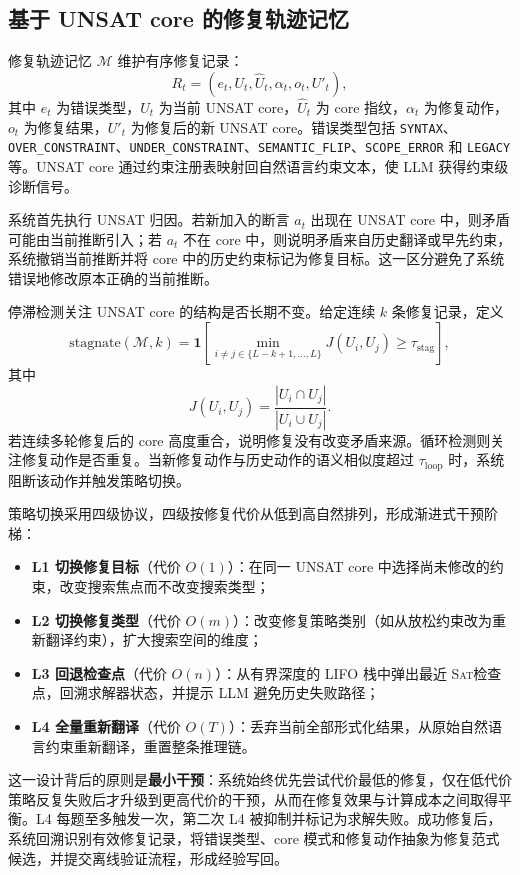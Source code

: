 \documentclass[UTF8,a4paper,12pt]{ctexart}
\newcommand{\sat}{\textsc{Sat}}
\begin{document}
\subsection{基于 UNSAT core 的修复轨迹记忆}

修复轨迹记忆 \(\mathcal{M}\) 维护有序修复记录：
\begin{equation}
  R_t=(e_t,U_t,\hat{U}_t,\alpha_t,o_t,U'_t),
\end{equation}
其中 \(e_t\) 为错误类型，\(U_t\) 为当前 UNSAT core，\(\hat{U}_t\) 为 core 指纹，\(\alpha_t\) 为修复动作，\(o_t\) 为修复结果，\(U'_t\) 为修复后的新 UNSAT core。错误类型包括 \texttt{SYNTAX}、\texttt{OVER\_CONSTRAINT}、\texttt{UNDER\_CONSTRAINT}、\texttt{SEMANTIC\_FLIP}、\texttt{SCOPE\_ERROR} 和 \texttt{LEGACY} 等。UNSAT core 通过约束注册表映射回自然语言约束文本，使 LLM 获得约束级诊断信号。

系统首先执行 UNSAT 归因。若新加入的断言 \(a_t\) 出现在 UNSAT core 中，则矛盾可能由当前推断引入；若 \(a_t\) 不在 core 中，则说明矛盾来自历史翻译或早先约束，系统撤销当前推断并将 core 中的历史约束标记为修复目标。这一区分避免了系统错误地修改原本正确的当前推断。

停滞检测关注 UNSAT core 的结构是否长期不变。给定连续 \(k\) 条修复记录，定义
\begin{equation}
  \text{stagnate}(\mathcal{M},k)=
  \mathbf{1}\left[
  \min_{i\neq j\in\{L-k+1,\ldots,L\}}J(U_i,U_j)\geq\tau_{\text{stag}}
  \right],
\end{equation}
其中
\begin{equation}
  J(U_i,U_j)=\frac{|U_i\cap U_j|}{|U_i\cup U_j|}.
\end{equation}
若连续多轮修复后的 core 高度重合，说明修复没有改变矛盾来源。循环检测则关注修复动作是否重复。当新修复动作与历史动作的语义相似度超过 \(\tau_{\text{loop}}\) 时，系统阻断该动作并触发策略切换。

策略切换采用四级协议，四级按修复代价从低到高自然排列，形成渐进式干预阶梯：
\begin{itemize}
  \item \textbf{L1 切换修复目标}（代价 \(O(1)\)）：在同一 UNSAT core 中选择尚未修改的约束，改变搜索焦点而不改变搜索类型；
  \item \textbf{L2 切换修复类型}（代价 \(O(m)\)）：改变修复策略类别（如从放松约束改为重新翻译约束），扩大搜索空间的维度；
  \item \textbf{L3 回退检查点}（代价 \(O(n)\)）：从有界深度的 LIFO 栈中弹出最近 \sat 检查点，回溯求解器状态，并提示 LLM 避免历史失败路径；
  \item \textbf{L4 全量重新翻译}（代价 \(O(T)\)）：丢弃当前全部形式化结果，从原始自然语言约束重新翻译，重置整条推理链。
\end{itemize}
这一设计背后的原则是\textbf{最小干预}：系统始终优先尝试代价最低的修复，仅在低代价策略反复失败后才升级到更高代价的干预，从而在修复效果与计算成本之间取得平衡。L4 每题至多触发一次，第二次 L4 被抑制并标记为求解失败。成功修复后，系统回溯识别有效修复记录，将错误类型、core 模式和修复动作抽象为修复范式候选，并提交离线验证流程，形成经验写回。
\end{document}
